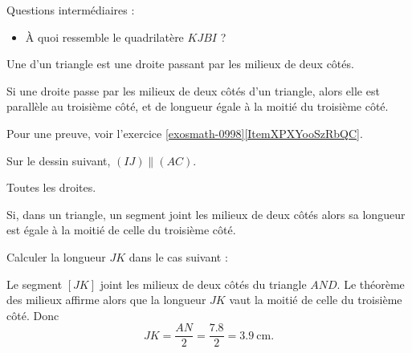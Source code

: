 



\vspace{2cm}

Questions intermédiaires : 
\begin{itemize}
    \item  À quoi ressemble le quadrilatère \( KJBI\) ?
\end{itemize}

\begin{definition}
    Une  d'un triangle est une droite passant par les milieux de deux côtés.
\end{definition}

\begin{theorem}
    Si une droite passe par les milieux de deux côtés d'un triangle, alors elle est parallèle au troisième côté, et de longueur égale à la moitié du troisième côté.
\end{theorem}

Pour une preuve, voir l'exercice \ref{exosmath-0998}\ref{ItemXPXYooSzRbQC}.

Sur le dessin suivant, \( (IJ)\parallel (AC)\).
\begin{center}
   
\end{center}

Toutes les droites.
\begin{center}
   
\end{center}

\begin{theorem}
Si, dans un triangle, un segment joint les milieux de deux côtés alors sa longueur est égale à la moitié de celle du troisième côté.
\end{theorem}

\begin{example}
    Calculer la longueur \( JK\) dans le cas suivant :
\begin{center}
   
\end{center}
\end{example}

Le segment \( [JK]\) joint les milieux de deux côtés du triangle \( AND\). Le théorème des milieux affirme alors que la longueur \( JK\) vaut la moitié de celle du troisième côté. Donc
\begin{equation}
    JK=\frac{ AN }{2}=\frac{ 7.8 }{ 2 }=\SI{3.9}{\centi\meter}.
\end{equation}

